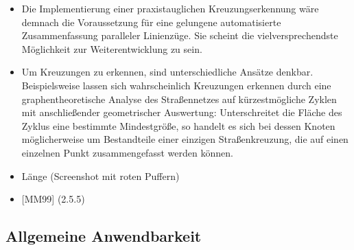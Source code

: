 \documentclass[../main/thesis.tex]{subfiles}
\begin{document}
\begin{itemize}
\item
Die Implementierung einer praxistauglichen Kreuzungserkennung wäre demnach die Voraussetzung für eine gelungene automatisierte Zusammenfassung paralleler Linienzüge.
Sie scheint die vielversprechendste Möglichkeit zur Weiterentwicklung zu sein.

\item
Um Kreuzungen zu erkennen, sind unterschiedliche Ansätze denkbar.
Beispielsweise lassen sich wahrscheinlich Kreuzungen erkennen durch eine graphentheoretische Analyse des Straßennetzes auf kürzestmögliche Zyklen mit anschließender geometrischer Auswertung:
Unterschreitet die Fläche des Zyklus eine bestimmte Mindestgröße, so handelt es sich bei dessen Knoten möglicherweise um Bestandteile einer einzigen Straßenkreuzung, die auf einen einzelnen Punkt zusammengefasst werden können.

\item Länge (Screenshot mit roten Puffern)

\item {[MM99]} (2.5.5)

\end{itemize}



\subsection{Allgemeine Anwendbarkeit}
\end{document}
